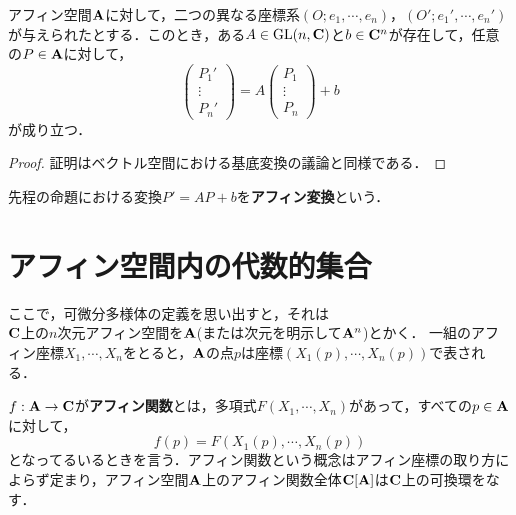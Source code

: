 \documentclass{myclass}
\begin{document}
\begin{proposition}
  アフィン空間$\mathbf{A}$に対して，二つの異なる座標系$(O;e_1,\cdots,e_n)$，$(O';e_1',\cdots,e_n')$が与えられたとする．このとき，ある$A\in \mathrm{GL}(n,\mathbf{C})$と$b\in \mathbf{C}^n$が存在して，任意の$P\in \mathbf{A}$に対して，
  \begin{equation*}
    \begin{pmatrix}
      P_1' \\ \vdots \\ P_n'
    \end{pmatrix}
    =
    A
    \begin{pmatrix}
      P_1 \\ \vdots \\ P_n
    \end{pmatrix}
    +
    b
  \end{equation*}
  が成り立つ．
\end{proposition}

\begin{proof}
  証明はベクトル空間における基底変換の議論と同様である．
\end{proof}

\begin{definition}
  先程の命題における変換$P' = AP + b$を\textbf{アフィン変換}という．
\end{definition}



\section{アフィン空間内の代数的集合}
ここで，可微分多様体の定義を思い出すと，それは\\

$\mathbf{C}$上の$n$次元アフィン空間を$\mathbf{A}$(または次元を明示して$\mathbf{A}^n$)とかく．
一組のアフィン座標$X_1,\cdots,X_n$をとると，$\mathbf{A}$の点$p$は座標$(X_1(p),\cdots,X_n(p))$で表される．
\begin{definition}
  $f:\mathbf{A} \to \mathbf{C}$が\textbf{アフィン関数}とは，多項式$F(X_1,\cdots,X_n)$があって，すべての$p\in \mathbf{A}$に対して，
  \begin{equation*}
    f(p) = F(X_1(p),\cdots,X_n(p))
  \end{equation*}
  となってるいるときを言う．アフィン関数という概念はアフィン座標の取り方によらず定まり，アフィン空間$\mathbf{A}$上のアフィン関数全体$\mathbf{C}[\mathbf{A}]$は$\mathbf{C}$上の可換環をなす．
\end{definition}

\backmatter

\printindex



\end{document}
